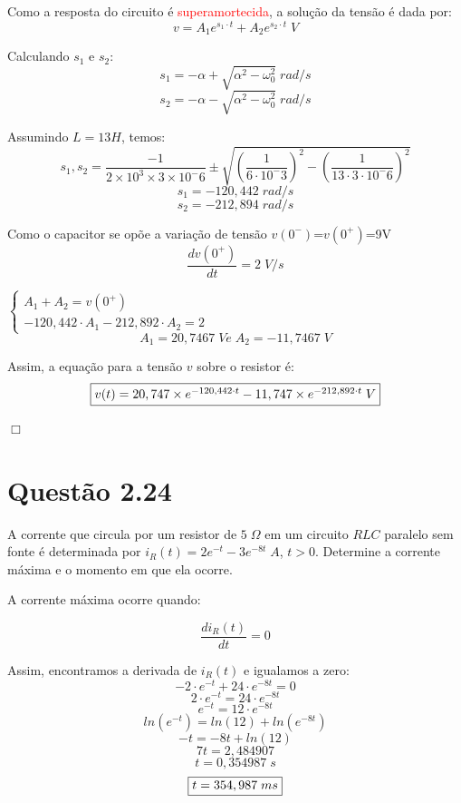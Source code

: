 \documentclass[
	12pt,				%
	oneside,			%
	a4paper,			%
	english,			%
	french,				%
	spanish,			%
	brazil				%
	]{abntex2}
\begin{document}
Como a resposta do circuito é \textcolor{red}{superamortecida}, a solução da tensão é dada por:
$$v=A_1e^{s_1\cdot t}+A_2e^{s_2\cdot t}\;V$$

Calculando $s_1$ e $s_2$:
$$s_1=-\alpha+\sqrt{\alpha^2-\omega_0^2}\; rad/s$$
$$s_2=-\alpha-\sqrt{\alpha^2-\omega_0^2}\; rad/s$$

Assumindo $L=13H$, temos:
$$s_1,s_2=\dfrac{-1}{2\times10^3\times3\times10^-6}\pm\sqrt{\left(\dfrac{1}{6\cdot10^-3}\right)^2-\left(\dfrac{1}{13\cdot3\cdot10^-6}\right)^2}$$
$$s_1=-120,442 \;rad/s$$
$$s_2=-212,894 \;rad/s$$

Como o capacitor se opõe a variação de tensão $v(0^-)$=$v(0^+)$=9\;V
$$\dfrac{dv(0^+)}{dt}=2\;V/s$$

$\begin{cases}
A_1+A_2=v(0^+) \\
-120,442\cdot A_1-212,892\cdot A_2=2
\end{cases}$
$$A_1=20,7467\;V e \;A_2=-11,7467\;V$$

Assim, a equação para a tensão $v$ sobre o resistor é:
\begin{equation}
    \centering
    \fbox{$v(t) = 20,747\times e^{-120,442\cdot t} - 11,747\times e^{-212,892\cdot t}\;V$}
\end{equation}

\begin{flushright}
    $\Box$
\end{flushright}
\newpage


\section*{Questão 2.24}
A corrente que circula por um resistor de $5\;\Omega$ em um circuito $RLC$ paralelo sem fonte é determinada por $i_R(t) = 2e^{-t}-3e^{-8t}\;A$, $t > 0$. Determine a corrente máxima e o momento em que ela ocorre.

A corrente máxima ocorre quando:

$$\dfrac{di_R(t)}{dt} = 0$$

Assim, encontramos a derivada de $i_R(t)$ e igualamos a zero:
$$-2\cdot e^{-t}+24\cdot e^{-8t} = 0$$
$$2\cdot e^{-t} = 24\cdot e^{-8t}$$
$$e^{-t} = 12\cdot e^{-8t}$$
$$ln(e^{-t}) = ln(12)+ln(e^{-8t})$$
$$-t = -8t + ln(12)$$
$$7t=2,484907$$
$$t=0,354987\;s$$
\begin{equation}
    \centering
    \fbox{$t=354,987\;ms$}
\end{equation}
\end{document}
